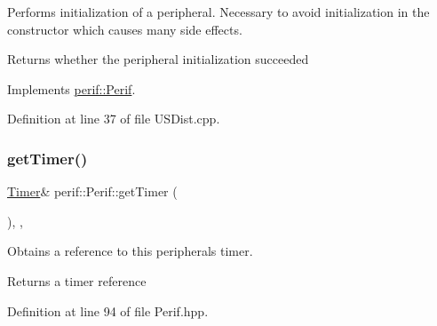 Performs initialization of a peripheral. Necessary to avoid initialization in the constructor which causes many side effects.

\begin{DoxyReturn}{Returns}
whether the peripheral initialization succeeded 
\end{DoxyReturn}


Implements \mbox{\hyperlink{classperif_1_1Perif_ae7f1d1a4e9cd2343d51abc4ee21000cf}{perif\+::\+Perif}}.



Definition at line 37 of file U\+S\+Dist.\+cpp.


\begin{DoxyCode}{0}

\end{DoxyCode}
\mbox{\label{classperif_1_1Perif_a29c48598a861d85256c30e28af67f864}} 
\subsubsection{\texorpdfstring{getTimer()}{getTimer()}}
{\footnotesize\ttfamily \mbox{\hyperlink{classTimer}{Timer}}\& perif\+::\+Perif\+::get\+Timer (\begin{DoxyParamCaption}{ }\end{DoxyParamCaption})\hspace{0.3cm}{\ttfamily [inline]}, {\ttfamily [protected]}, {\ttfamily [inherited]}}

Obtains a reference to this peripheral\textquotesingle{}s timer.

\begin{DoxyReturn}{Returns}
a timer reference 
\end{DoxyReturn}


Definition at line 94 of file Perif.\+hpp.


